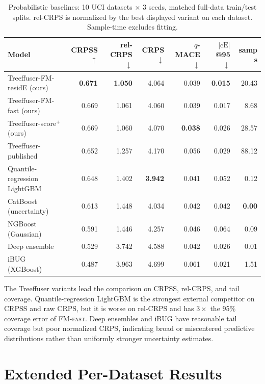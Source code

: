 \documentclass{uai2026}
\begin{document}
\begin{table}[!h]
  \centering
  \caption{Probabilistic baselines: 10 UCI datasets $\times$ 3 seeds, matched full-data train/test splits. rel-CRPS is normalized by the best displayed variant on each dataset. Sample-time excludes fitting.}\label{tab:competitors}
  \scriptsize
  \begin{tabular}{lrrrrrr}
    \toprule
    Model & CRPSS $\uparrow$ & rel-CRPS $\downarrow$ & CRPS $\downarrow$ & $q$-MACE $\downarrow$ & $|\text{cE}|$@95 $\downarrow$ & samp s \\
    \midrule
    Treeffuser-FM-residE (ours)     & \textbf{0.671} & \textbf{1.050} & 4.064 & 0.039 & \textbf{0.015} & 20.43 \\
    Treeffuser-FM-fast (ours)       & 0.669 & 1.061 & 4.060 & 0.039 & 0.017 & 8.68 \\
    Treeffuser-score$^+$ (ours)     & 0.669 & 1.060 & 4.070 & \textbf{0.038} & 0.026 & 28.57 \\
    Treeffuser-published            & 0.652 & 1.257 & 4.170 & 0.056 & 0.029 & 88.12 \\
    Quantile-regression LightGBM    & 0.648 & 1.402 & \textbf{3.942} & 0.041 & 0.052 & 0.12 \\
    CatBoost (uncertainty)          & 0.613 & 1.448 & 4.034 & 0.042 & 0.042 & \textbf{0.00} \\
    NGBoost (Gaussian)              & 0.591 & 1.446 & 4.257 & 0.046 & 0.064 & 0.09 \\
    Deep ensemble                   & 0.529 & 3.742 & 4.588 & 0.042 & 0.026 & 0.01 \\
    iBUG (XGBoost)                  & 0.487 & 3.963 & 4.699 & 0.061 & 0.021 & 1.51 \\
    \bottomrule
  \end{tabular}
\end{table}

The Treeffuser variants lead the comparison on CRPSS, rel-CRPS, and tail coverage. Quantile-regression LightGBM is the strongest external competitor on CRPSS and raw CRPS, but it is worse on rel-CRPS and has $3\times$ the 95\% coverage error of \textsc{FM-fast}. Deep ensembles and iBUG have reasonable tail coverage but poor normalized CRPS, indicating broad or miscentered predictive distributions rather than uniformly stronger uncertainty estimates.

\section{Extended Per-Dataset Results}\label{app:perdata-ext}
\end{document}
